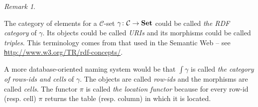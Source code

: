 \documentclass{amsart}
\def\mc{\mathcal}
\def\to{\rightarrow}
\def\taking{\colon}
\def\Set{{\bf Set}}
\def\mcC{\mc{C}}
\theoremstyle{remark}
\newtheorem{remark}[theorem]{Remark}
\theoremstyle{definition}
\begin{document}
\begin{remark}\label{rem:rdf}

The  category of elements for a $\mcC$-set $\gamma\taking\mcC\to\Set$ could be called {\em the RDF category} of $\gamma$.  Its objects could be called {\em URIs} and its morphisms could be called {\em triples}.  This terminology comes from that used in the Semantic Web -- see \href{http://www.w3.org/TR/rdf-concepts/}{\texttt http://www.w3.org/TR/rdf-concepts/}.  

A more database-oriented naming system would be that $\int\gamma$ is called {\em the category of rows-ids and cells} of $\gamma$.  The objects are called {\em row-ids} and the morphisms are called {\em cells}.  The functor $\pi$ is called {\em the location functor} because for every row-id (resp. cell) $\pi$ returns the table (resp. column) in which it is located.

\end{remark}
\end{document}
